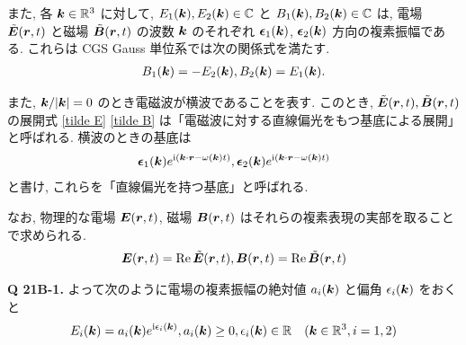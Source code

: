 \documentclass[uplatex,a4paper,dvipdfmx]{jsarticle}
\theoremstyle{definition}
\begin{document}
また, 各 $\vb*{k}\in\mathbb{R}^3$ に対して, $E_1(\vb*{k}), E_2(\vb*{k})\in\mathbb{C}$ と $B_1(\vb*{k}), B_2(\vb*{k})\in\mathbb{C}$ は, 電場 $\tilde{\vb*{E}}(\vb*{r}, t)$ と磁場 $\tilde{\vb*{B}}(\vb*{r}, t)$ の波数 $\vb*{k}$ のそれぞれ $\vb*{\epsilon}_1(\vb*{k})$, $\vb*{\epsilon}_2(\vb*{k})$ 方向の複素振幅である. これらは CGS Gauss 単位系では次の関係式を満たす.
\begin{align}
  B_1(\vb*{k}) = -E_2(\vb*{k}), B_2(\vb*{k}) = E_1(\vb*{k}).
\end{align}

また, $\vb*{k}/|\vb*{k}| = 0$ のとき電磁波が横波であることを表す.
このとき, $\tilde{\vb*{E}}(\vb*{r}, t), \tilde{\vb*{B}}(\vb*{r}, t)$ の展開式 \eqref{tilde E} \eqref{tilde B} は「電磁波に対する直線偏光をもつ基底による展開」と呼ばれる. 横波のときの基底は
\begin{align}
  \vb*{\epsilon}_1(\vb*{k})e^{\mathrm{i}(\vb*{k}\cdot\vb*{r}-\omega(\vb*{k})t)}, \vb*{\epsilon}_2(\vb*{k})e^{\mathrm{i}(\vb*{k}\cdot\vb*{r}-\omega(\vb*{k})t)}
\end{align}
と書け, これらを「直線偏光を持つ基底」と呼ばれる.

なお, 物理的な電場 $\vb*{E}(\vb*{r}, t)$, 磁場 $\vb*{B}(\vb*{r}, t)$ はそれらの複素表現の実部を取ることで求められる.
\begin{align}
  \vb*{E}(\vb*{r}, t) = \Re\tilde{\vb*{E}}(\vb*{r}, t), \vb*{B}(\vb*{r}, t) = \Re\tilde{\vb*{B}}(\vb*{r}, t)
\end{align}

\textbf{Q 21B-1.} よって次のように電場の複素振幅の絶対値 $a_i(\vb*{k})$ と偏角 $\epsilon_i(\vb*{k})$ をおくと
\begin{align}
  E_i(\vb*{k}) = a_i(\vb*{k}) e^{\mathrm{i}\epsilon_i(\vb*{k})}, a_i(\vb*{k}) \geq 0, \epsilon_i(\vb*{k})\in\mathbb{R} \quad (\vb*{k}\in\mathbb{R}^3, i = 1, 2)
\end{align}
\end{document}
